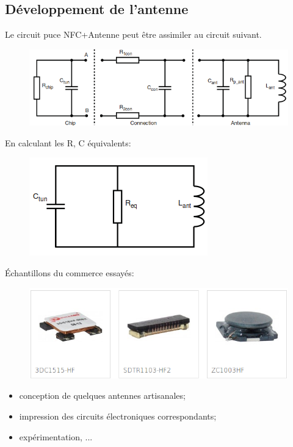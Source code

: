 \documentclass{beamer}
\begin{document}
\subsection{Développement de l'antenne}

\begin{frame}

Le circuit puce NFC+Antenne peut être assimiler au circuit suivant.
\begin{figure}
\centering
\includegraphics[scale=0.4]{images/withPARA.png}
\end{figure}

En calculant les R, C équivalents:
\begin{figure}
\centering
\includegraphics[scale=0.4]{images/circuiteq.png}
\end{figure}
\end{frame}


\begin{frame}

Échantillons du commerce essayés:
\begin{figure}
\centering
\includegraphics[scale=0.5]{images/antennas.png}
\end{figure}
\begin{itemize}
\item conception de quelques antennes artisanales;
\item impression des circuits électroniques correspondants;
\item expérimentation, ...
\end{itemize}
\end{frame}
\end{document}
